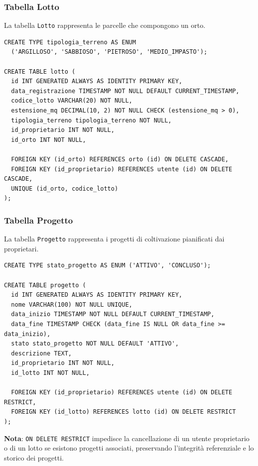 \documentclass[12pt,a4paper]{article}
\begin{document}
\subsubsection{Tabella Lotto}

La tabella \texttt{Lotto} rappresenta le parcelle che compongono un orto.

\begin{lstlisting}[style=sqlstyle]
CREATE TYPE tipologia_terreno AS ENUM 
  ('ARGILLOSO', 'SABBIOSO', 'PIETROSO', 'MEDIO_IMPASTO');

CREATE TABLE lotto (
  id INT GENERATED ALWAYS AS IDENTITY PRIMARY KEY,
  data_registrazione TIMESTAMP NOT NULL DEFAULT CURRENT_TIMESTAMP,
  codice_lotto VARCHAR(20) NOT NULL,
  estensione_mq DECIMAL(10, 2) NOT NULL CHECK (estensione_mq > 0),
  tipologia_terreno tipologia_terreno NOT NULL,
  id_proprietario INT NOT NULL,
  id_orto INT NOT NULL,
  
  FOREIGN KEY (id_orto) REFERENCES orto (id) ON DELETE CASCADE,
  FOREIGN KEY (id_proprietario) REFERENCES utente (id) ON DELETE CASCADE,
  UNIQUE (id_orto, codice_lotto)
);
\end{lstlisting}

\subsubsection{Tabella Progetto}

La tabella \texttt{Progetto} rappresenta i progetti di coltivazione pianificati dai proprietari.

\begin{lstlisting}[style=sqlstyle]
CREATE TYPE stato_progetto AS ENUM ('ATTIVO', 'CONCLUSO');

CREATE TABLE progetto (
  id INT GENERATED ALWAYS AS IDENTITY PRIMARY KEY,
  nome VARCHAR(100) NOT NULL UNIQUE,
  data_inizio TIMESTAMP NOT NULL DEFAULT CURRENT_TIMESTAMP,
  data_fine TIMESTAMP CHECK (data_fine IS NULL OR data_fine >= data_inizio),
  stato stato_progetto NOT NULL DEFAULT 'ATTIVO',
  descrizione TEXT,
  id_proprietario INT NOT NULL,
  id_lotto INT NOT NULL,
  
  FOREIGN KEY (id_proprietario) REFERENCES utente (id) ON DELETE RESTRICT,
  FOREIGN KEY (id_lotto) REFERENCES lotto (id) ON DELETE RESTRICT
);
\end{lstlisting}

\textbf{Nota}: \texttt{ON DELETE RESTRICT} impedisce la cancellazione di un utente proprietario o di un lotto se esistono progetti associati, preservando l'integrità referenziale e lo storico dei progetti.
\end{document}
